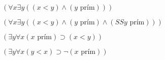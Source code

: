 $(\forall x \exists y ((x<y)\wedge(y \text{ prím})))$

$(\forall x \exists y ((x<y)\wedge(y \text{ prím})\wedge(SSy \text{ prím})))$

$(\exists y \forall x (x \text{ prím}) \supset (x<y)) $

$(\exists y \forall x (y<x) \supset \neg (x \text{ prím}))$
